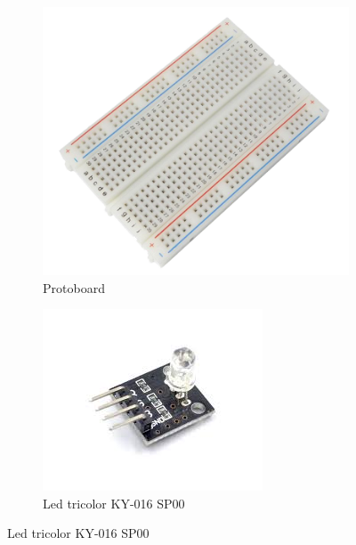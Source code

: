 \documentclass{article}
\begin{document}
\begin{figure}[!ht]
	\centering
	\begin{subfigure}[b]{0.45\textwidth}
		\includegraphics[width=\textwidth]{../images/protoboard.png}
		\caption*{Protoboard}
		\label{fig:protoboard}
	\end{subfigure}
	\hfill
	\begin{subfigure}[b]{0.45\textwidth}
		\includegraphics[width=\textwidth]{../images/led_tricolor.jpg}
		\caption*{Led tricolor KY-016 SP00}
		\label{fig:led tricolor}
	\end{subfigure}
\end{figure}
\end{document}
